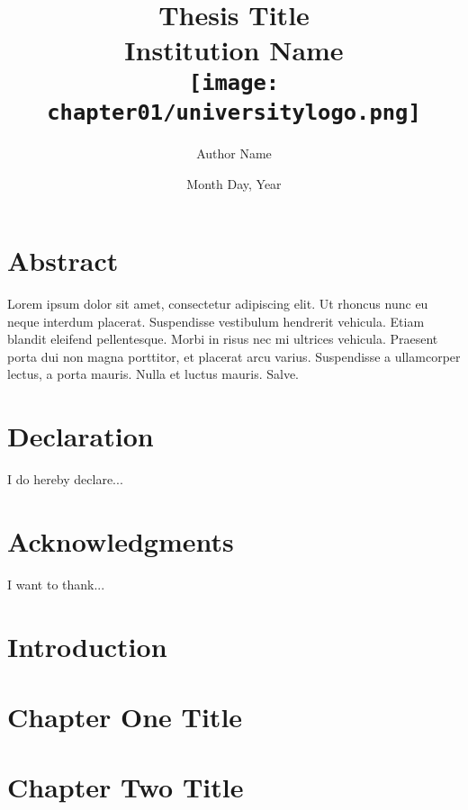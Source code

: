 





\title{
	{Thesis Title}\\
	{\large Institution Name}\\
	{\texttt{[image: chapter01/universitylogo.png]}}
}

\author{Author Name}
\date{Month Day, Year}



\maketitle
\chapter*{Abstract}
Lorem ipsum dolor sit amet, consectetur adipiscing elit. Ut rhoncus nunc eu neque interdum placerat. Suspendisse vestibulum hendrerit vehicula. Etiam blandit eleifend pellentesque. Morbi in risus nec mi ultrices vehicula. Praesent porta dui non magna porttitor, et placerat arcu varius. Suspendisse a ullamcorper lectus, a porta mauris. Nulla et luctus mauris. Salve.

\chapter*{Declaration}
I do hereby declare...

\chapter*{Acknowledgments}
I want to thank...

\tableofcontents

\chapter{Introduction}


\chapter{Chapter One Title}


\chapter{Chapter Two Title}



